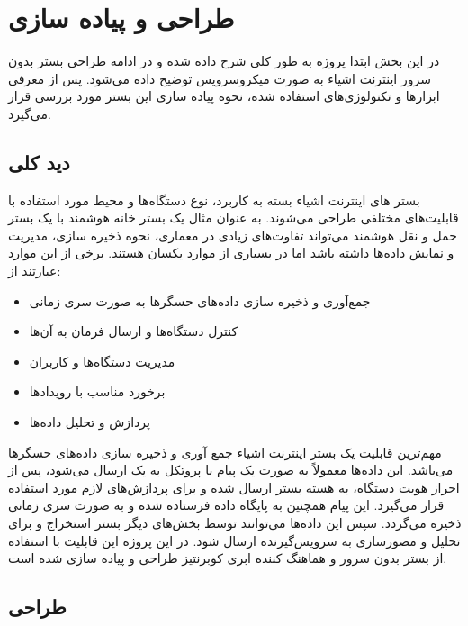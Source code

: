 \chapter{طراحی و پیاده سازی}\label{chapter3}

در این بخش ابتدا پروژه به طور کلی شرح داده شده و در ادامه طراحی بستر بدون سرور اینترنت اشیاء به صورت میکروسرویس توضیح داده می‌شود. پس از معرفی ابزارها و تکنولوژی‌های استفاده شده، نحوه پیاده سازی این بستر مورد بررسی قرار می‌گیرد.

\section{دید کلی}

بستر های اینترنت اشیاء بسته به کاربرد، نوع دستگاه‌ها و محیط مورد استفاده با قابلیت‌های مختلفی طراحی می‌شوند. به عنوان مثال یک بستر خانه هوشمند با یک بستر حمل و نقل هوشمند می‌تواند تفاوت‌های زیادی در معماری، نحوه ذخیره سازی، مدیریت و نمایش داده‌ها داشته باشد اما در بسیاری از موارد یکسان هستند. برخی از این موارد عبارتند از:
\begin{itemize}
	
	\item جمع‌‌آوری و ذخیره سازی داده‌های حسگر‌ها به صورت سری زمانی
	
	\item کنترل دستگاه‌ها و ارسال فرمان به آن‌ها
	
	\item مدیریت دستگاه‌ها و کاربران
	
	\item برخورد مناسب با رویداد‌ها
	
	\item پردازش و تحلیل داده‌ها
	
\end{itemize}

مهم‌ترین قابلیت یک بستر اینترنت اشیاء جمع آوری و ذخیره سازی داده‌های حسگر‌ها می‌باشد. این داده‌ها معمولاً به صورت یک پیام با پروتکل  به یک  ارسال می‌شود، پس از احراز هویت دستگاه، به هسته بستر ارسال شده و برای پردازش‌های لازم مورد استفاده قرار می‌گیرد. این پیام همچنین به پایگاه داده فرستاده شده و به صورت سری زمانی ذخیره می‌گردد. سپس این داده‌ها می‌توانند توسط بخش‌های دیگر بستر استخراج و برای تحلیل و مصورسازی به سرویس‌گیرنده ارسال شود. در این پروژه این قابلیت با استفاده از بستر بدون سرور  و هماهنگ کننده ابری ‌کوبرنتیز طراحی و پیاده سازی شده است.

\newpage

\section{طراحی}

